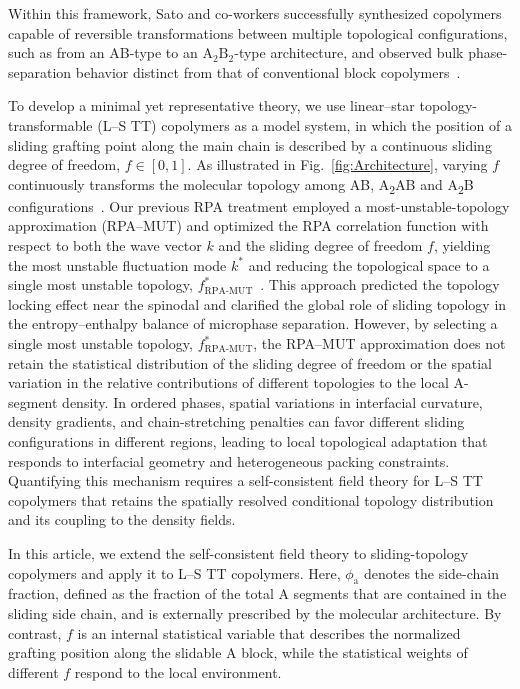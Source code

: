 Within this framework, Sato and co-workers successfully synthesized copolymers capable of reversible transformations between multiple topological configurations, such as from an AB-type to an $\mathrm{A}_2\mathrm{B}_2$-type architecture, and observed bulk phase-separation behavior distinct from that of conventional block copolymers~\cite{HirokiSato2021Topologytransformable}.


To develop a minimal yet representative theory, we use linear--star topology-transformable (L--S TT) copolymers as a model system, in which the position of a sliding grafting point along the main chain is described by a continuous sliding degree of freedom, $f\in[0,1]$.
As illustrated in Fig.~\ref{fig:Architecture}, varying $f$ continuously transforms the molecular topology among AB, A\textsubscript{2}AB and A\textsubscript{2}B configurations~\cite{ToshikazuTakata2020Switchable, HirokiSato2021Topologytransformable, Zhao2024Phase}.
Our previous RPA treatment employed a most-unstable-topology approximation (RPA--MUT) and optimized the RPA correlation function with respect to both the wave vector $k$ and the sliding degree of freedom $f$, yielding the most unstable fluctuation mode $k^\ast$ and reducing the topological space to a single most unstable topology, $f_{\mathrm{RPA\text{-}MUT}}^\ast$~\cite{Zhao2024Phase, Bu2019Bistable}.
This approach predicted the topology locking effect near the spinodal and clarified the global role of sliding topology in the entropy--enthalpy balance of microphase separation. 
However, by selecting a single most unstable topology, $f_{\mathrm{RPA\text{-}MUT}}^\ast$, the RPA--MUT approximation does not retain the statistical distribution of the sliding degree of freedom or the spatial variation in the relative contributions of different topologies to the local A-segment density.
In ordered phases, spatial variations in interfacial curvature, density gradients, and chain-stretching penalties can favor different sliding configurations in different regions, leading to local topological adaptation that responds to interfacial geometry and heterogeneous packing constraints.
Quantifying this mechanism requires a self-consistent field theory for L--S TT copolymers that retains the spatially resolved conditional topology distribution and its coupling to the density fields.


In this article, we extend the self-consistent field theory to sliding-topology copolymers and apply it to L--S TT copolymers.
Here, $\phi_{\mathrm a}$ denotes the side-chain fraction, defined as the fraction of the total A segments that are contained in the sliding side chain, and is externally prescribed by the molecular architecture.
By contrast, $f$ is an internal statistical variable that describes the normalized grafting position along the slidable A block, while the statistical weights of different $f$ respond to the local environment.

